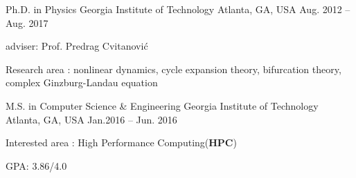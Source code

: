 


\begin{cventries}

\cveducation
{Ph.D. in Physics}
{Georgia Institute of Technology}
{Atlanta, GA, USA}
{Aug. 2012 -- Aug. 2017}
{
  \begin{cvitems}
    \item adviser: Prof. Predrag Cvitanovi\'c
    \item Research area : nonlinear dynamics, cycle expansion theory, bifurcation theory,
      complex Ginzburg-Landau equation
  \end{cvitems}
}


\cveducation
{M.S. in Computer Science \& Engineering }
{Georgia Institute of Technology}
{Atlanta, GA, USA}
{Jan.2016 -- Jun. 2016}
{
  \begin{cvitems}
    \item Interested area : High Performance Computing(\textbf{HPC})
    \item GPA: 3.86/4.0
  \end{cvitems}
}





\end{cventries}
